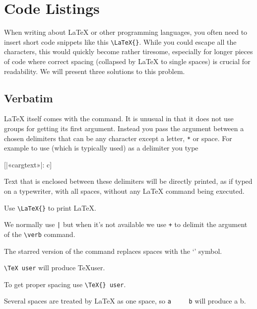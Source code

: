 \section{Code Listings}\label{sec:code_listings}

When writing about \LaTeX{} or other programming languages, you often need to
insert short code snippets like this \verb|\LaTeX{}|. While you could escape
all the characters, this would quickly become rather tiresome, especially for
longer pieces of code where correct spacing (collapsed by \LaTeX{} to single
spaces) is crucial for readability. We will present three solutions to this
problem.

\subsection{Verbatim}\label{sec:verbatim}

\LaTeX{} itself comes with the  command. It is unusual in that it does
not use groups for getting its first argument. Instead you pass the argument between a
chosen delimiters that can be any character except a letter, \verb|*| or
space. For example to use \cargv{|} (which is typically used) as a delimiter
you type
\begin{lscommand}
  [|«\bs carg{text}»|: c]
\end{lscommand}
Text that is enclosed between these delimiters will be directly printed, as if
typed on a typewriter, with all spaces, without any \LaTeX{} command being
executed.
\begin{example}
Use \verb|\LaTeX{}| to 
print \LaTeX.

We normally use \verb+|+ but
when it's not available we
use \verb|+| to delimit the
argument of the \verb|\verb|
command.
\end{example}

The starred version of the  command replaces spaces with the
\enquote*{\textvisiblespace{}} symbol.

\begin{chktexignore}
\begin{example}
\verb*|\TeX user| will
produce \TeX user.

To get proper spacing use
\verb*|\TeX{} user|.

Several spaces are treated
by \LaTeX{} as one space, 
so \verb*|a     b| will
produce a     b.
\end{example}
\end{chktexignore}

